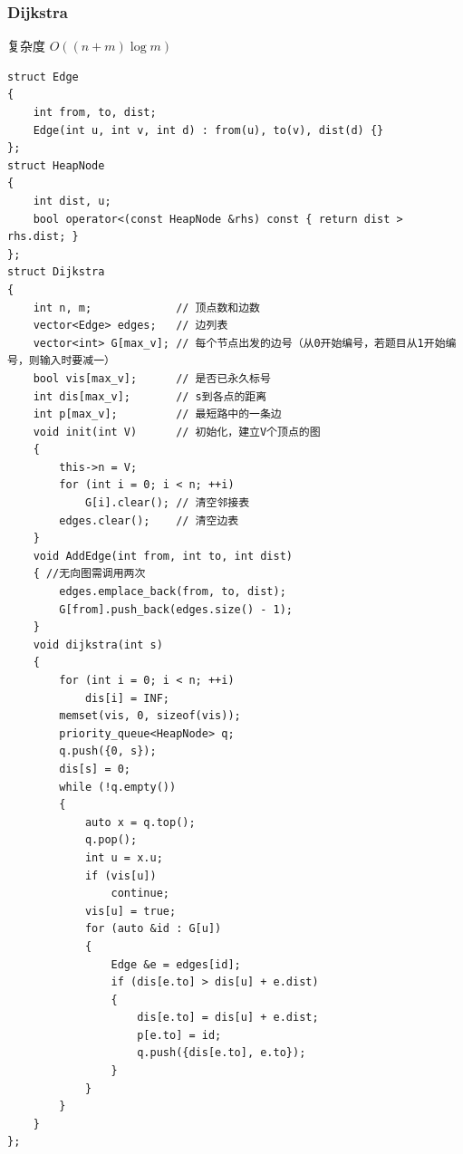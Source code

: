 \documentclass[twoside]{article}
\begin{document}
\subsubsection{Dijkstra}
复杂度 $O((n+m) \log m)$
\begin{lstlisting}
struct Edge
{
    int from, to, dist;
    Edge(int u, int v, int d) : from(u), to(v), dist(d) {}
};
struct HeapNode
{
    int dist, u;
    bool operator<(const HeapNode &rhs) const { return dist > rhs.dist; }
};
struct Dijkstra
{
    int n, m;             // 顶点数和边数
    vector<Edge> edges;   // 边列表
    vector<int> G[max_v]; // 每个节点出发的边号（从0开始编号，若题目从1开始编号，则输入时要减一）
    bool vis[max_v];      // 是否已永久标号
    int dis[max_v];       // s到各点的距离
    int p[max_v];         // 最短路中的一条边
    void init(int V)      // 初始化，建立V个顶点的图
    {
        this->n = V;
        for (int i = 0; i < n; ++i)
            G[i].clear(); // 清空邻接表
        edges.clear();    // 清空边表
    }
    void AddEdge(int from, int to, int dist)
    { //无向图需调用两次
        edges.emplace_back(from, to, dist);
        G[from].push_back(edges.size() - 1);
    }
    void dijkstra(int s)
    {
        for (int i = 0; i < n; ++i)
            dis[i] = INF;
        memset(vis, 0, sizeof(vis));
        priority_queue<HeapNode> q;
        q.push({0, s});
        dis[s] = 0;
        while (!q.empty())
        {
            auto x = q.top();
            q.pop();
            int u = x.u;
            if (vis[u])
                continue;
            vis[u] = true;
            for (auto &id : G[u])
            {
                Edge &e = edges[id];
                if (dis[e.to] > dis[u] + e.dist)
                {
                    dis[e.to] = dis[u] + e.dist;
                    p[e.to] = id;
                    q.push({dis[e.to], e.to});
                }
            }
        }
    }
};
\end{lstlisting}
\end{document}

